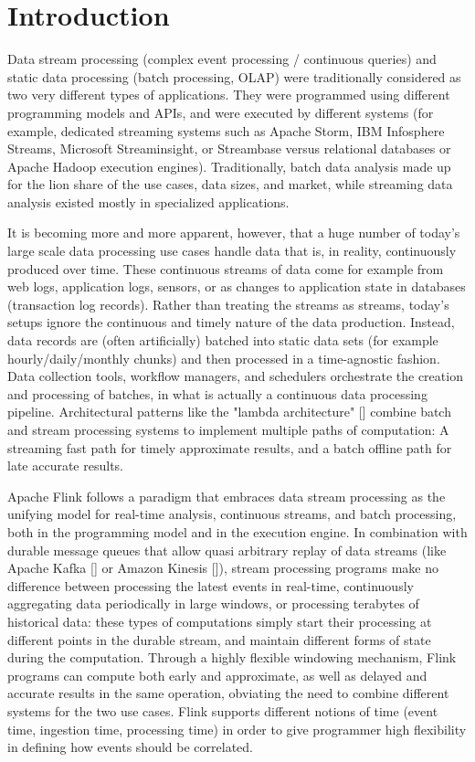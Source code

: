 \section{Introduction}
\label{sec:intro}
Data stream processing (complex event processing / continuous queries) and static data processing (batch processing, OLAP) were traditionally considered as two very different types of applications. They were programmed using different programming models and APIs, and were executed by different systems (for example, dedicated streaming systems such as  Apache Storm, IBM Infosphere Streams, Microsoft Streaminsight, or Streambase versus relational databases or Apache Hadoop execution engines). Traditionally, batch data analysis made up for the lion share of the use cases, data sizes, and market, while streaming data analysis existed mostly in specialized applications.

It is becoming more and more apparent, however, that a huge number of today's large scale data processing use cases handle data that is, in reality, continuously produced over time. These continuous streams of data come for example from web logs, application logs, sensors, or as changes to application state in databases (transaction log records). Rather than treating the streams as streams, today's setups ignore the continuous and timely nature of the data production. Instead, data records are (often artificially) batched into static data sets (for example hourly/daily/monthly chunks) and then processed in a time-agnostic fashion. Data collection tools, workflow managers, and schedulers orchestrate the creation and processing of batches, in what is actually a continuous data processing pipeline. Architectural patterns like the "lambda architecture" [] combine batch and stream processing systems to implement multiple paths of computation: A streaming fast path for timely approximate results, and a batch offline path for late accurate results.

Apache Flink follows a paradigm that embraces data stream processing as the unifying model for real-time analysis, continuous streams, and batch processing, both in the programming model and in the execution engine. In combination with durable message queues that allow quasi arbitrary replay of data streams (like Apache Kafka [] or Amazon Kinesis []), stream processing programs make no difference between processing the latest events in real-time, continuously aggregating data periodically in large windows, or processing terabytes of historical data: these types of computations simply start their processing at different points in the durable stream, and maintain different forms of state during the computation. Through a highly flexible windowing mechanism, Flink programs can compute both early and approximate, as well as delayed and accurate results in the same operation, obviating the need to combine different systems for the two use cases. Flink supports different notions of time (event time, ingestion time, processing time) in order to give programmer high flexibility in defining how events should be correlated.
 
